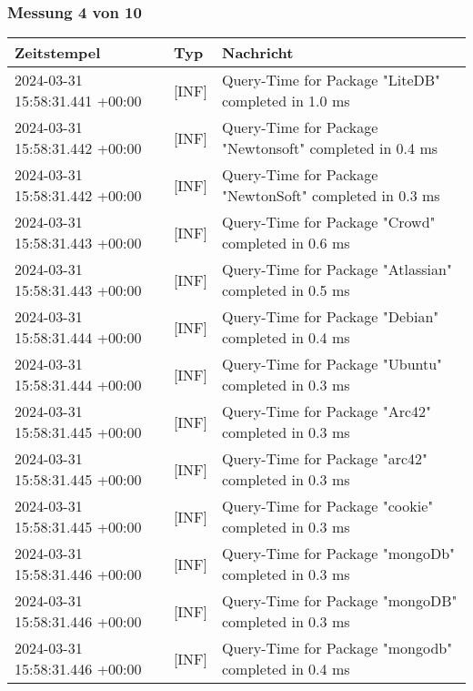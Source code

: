     \subsubsection{Messung 4 von 10} \label{subsubsec:MySQLMitIndex4von10}
        {
            {\small
                \begin{tabularx}{\textwidth}{|l|l|X|}
                    \hline
                    \textbf{Zeitstempel} & \textbf{Typ} & \textbf{Nachricht} \\
                    \hline
                    \endhead
                    2024-03-31 15:58:31.441 +00:00 & [INF] & Query-Time for Package "LiteDB" completed in 1.0 ms \\
                    2024-03-31 15:58:31.442 +00:00 & [INF] & Query-Time for Package "Newtonsoft" completed in 0.4 ms \\
                    2024-03-31 15:58:31.442 +00:00 & [INF] & Query-Time for Package "NewtonSoft" completed in 0.3 ms \\
                    2024-03-31 15:58:31.443 +00:00 & [INF] & Query-Time for Package "Crowd" completed in 0.6 ms \\
                    2024-03-31 15:58:31.443 +00:00 & [INF] & Query-Time for Package "Atlassian" completed in 0.5 ms \\
                    2024-03-31 15:58:31.444 +00:00 & [INF] & Query-Time for Package "Debian" completed in 0.4 ms \\
                    2024-03-31 15:58:31.444 +00:00 & [INF] & Query-Time for Package "Ubuntu" completed in 0.3 ms \\
                    2024-03-31 15:58:31.445 +00:00 & [INF] & Query-Time for Package "Arc42" completed in 0.3 ms \\
                    2024-03-31 15:58:31.445 +00:00 & [INF] & Query-Time for Package "arc42" completed in 0.3 ms \\
                    2024-03-31 15:58:31.445 +00:00 & [INF] & Query-Time for Package "cookie" completed in 0.3 ms \\
                    2024-03-31 15:58:31.446 +00:00 & [INF] & Query-Time for Package "mongoDb" completed in 0.3 ms \\
                    2024-03-31 15:58:31.446 +00:00 & [INF] & Query-Time for Package "mongoDB" completed in 0.3 ms \\
                    2024-03-31 15:58:31.446 +00:00 & [INF] & Query-Time for Package "mongodb" completed in 0.4 ms \\

\end{tabularx}}}
